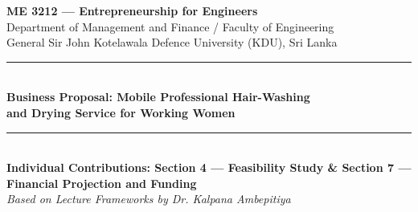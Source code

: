 \documentclass[11pt,a4paper]{article}
\begin{document}
\begin{center}
    {\large \textbf{ME 3212 — Entrepreneurship for Engineers}}\\[0.2em]
    {\normalsize Department of Management and Finance / Faculty of Engineering}\\[0.2em]
    {\normalsize General Sir John Kotelawala Defence University (KDU), Sri Lanka}\\[0.5em]
    \rule{\textwidth}{1pt}\\[0.4em]
    {\LARGE \textbf{Business Proposal: Mobile Professional Hair-Washing}}\\[0.2em]
    {\LARGE \textbf{and Drying Service for Working Women}}\\[0.5em]
    \rule{\textwidth}{0.5pt}\\[0.3em]
    {\small \textbf{Individual Contributions: Section 4 — Feasibility Study \& Section 7 — Financial Projection and Funding}}\\[0.2em]
    {\footnotesize \textit{Based on Lecture Frameworks by Dr. Kalpana Ambepitiya}}
\end{center}
\vspace{0.8em}



\newpage

\end{document}
